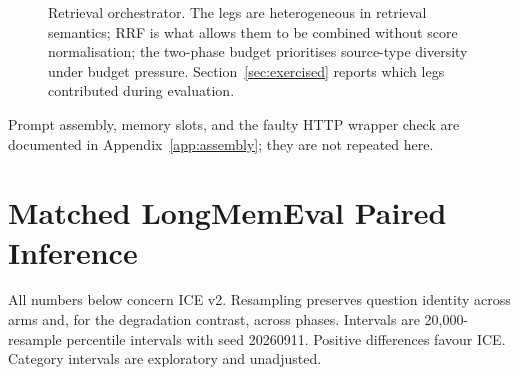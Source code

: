 \documentclass[11pt,a4paper]{article}
\begin{document}
\begin{figure}[t]
\centering
{}
\caption{Retrieval orchestrator. The legs are heterogeneous in retrieval semantics; RRF is what allows them to be combined without score normalisation; the two-phase budget prioritises source-type diversity under budget pressure. Section~\ref{sec:exercised} reports which legs contributed during evaluation.}
\label{fig:orchestrator}
\end{figure}

Prompt assembly, memory slots, and the faulty HTTP wrapper check are documented in Appendix~\ref{app:assembly}; they are not repeated here.

\FloatBarrier
\section{Matched LongMemEval Paired Inference}
\label{app:lme-paired}
All numbers below concern ICE v2. Resampling preserves question identity across arms and, for the degradation contrast, across phases. Intervals are 20,000-resample percentile intervals with seed 20260911. Positive differences favour ICE. Category intervals are exploratory and unadjusted.
\end{document}
